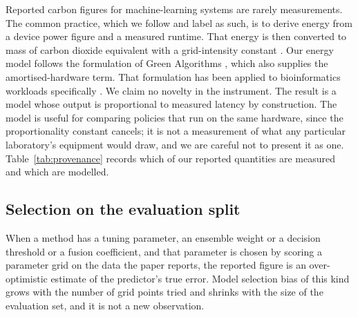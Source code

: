 Reported carbon figures for machine-learning systems are rarely measurements.
The common practice, which we follow and label as such, is to derive energy from
a device power figure and a measured runtime. That energy is then converted to
mass of carbon dioxide equivalent with a grid-intensity constant
\citep{strubell2019energy,lacoste2019quantifying,patterson2021carbon}. Our
energy model follows the formulation of Green Algorithms
\citep{lannelongue2021green}, which also supplies the amortised-hardware term.
That formulation has been applied to bioinformatics workloads specifically
\citep{grealey2022carbon}. We claim no novelty in the instrument. The
result is a model whose output is proportional to measured latency by
construction. The model is useful for comparing policies that run on the same
hardware, since the proportionality constant cancels; it is not a measurement
of what any particular laboratory's equipment would draw, and we are careful
not to present
it as one. Table~\ref{tab:provenance} records which of our reported quantities
are measured and which are modelled.

\subsection{Selection on the evaluation split}

When a method has a tuning parameter, an ensemble weight or a decision
threshold or a fusion coefficient, and that parameter is chosen by scoring a
parameter grid on the data the paper reports, the reported figure is an
over-optimistic estimate of the predictor's true error. Model selection bias of
this kind grows with the number of grid points tried and shrinks with the size
of the evaluation set, and it is not a new observation.


